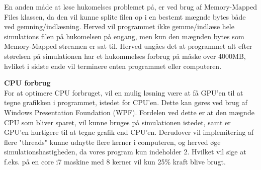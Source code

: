 En anden måde at løse hukomelses problemet på, er ved brug af Memory-Mapped Files klassen, da den vil kunne splite filen op i en bestemt mægnde bytes  både ved gemning/indlæsning. Herved vil programmet ikke gemme/indlæse hele simulations filen på hukomelsen på engang, men kun den mægnden bytes som Memory-Mapped streamen er sat til. Herved ungåes det at programmet alt efter størelsen på simulationen har et hukommelses forbrug på måske over 4000MB, hvliket i sidste ende vil terminere enten programmet eller computeren.

\vspace{5mm}

\textbf{CPU forbrug} \\
For at optimere CPU forbruget, vil en mulig løsning være at få GPU'en til at tegne grafikken i programmet, istedet for CPU'en. Dette kan gøres ved brug af Windows Presentation Foundation (WPF). Fordelen ved dette er at den mægnde CPU som bliver sparet,  vil kunne bruges på simulationen istedet, samt er GPU'en hurtigere til at tegne grafik end CPU'en. Derudover vil implemitering af flere "threads" kunne udnytte flere kerner i computeren, og herved øge simulationshastigheden, da vores program kun indeholder 2. Hvilket vil sige at f.eks. på en core i7 maskine med 8 kerner vil kun 25\% kraft blive brugt.






